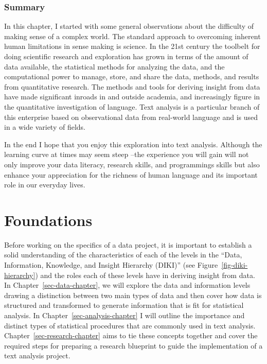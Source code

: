 \documentclass[
  letterpaper,
]{book}
\theoremstyle{definition}
\theoremstyle{remark}
\begin{document}
\section*{Summary}\label{summary}


In this chapter, I started with some general observations about the
difficulty of making sense of a complex world. The standard approach to
overcoming inherent human limitations in sense making is science. In the
21st century the toolbelt for doing scientific research and exploration
has grown in terms of the amount of data available, the statistical
methods for analyzing the data, and the computational power to manage,
store, and share the data, methods, and results from quantitative
research. The methods and tools for deriving insight from data have made
significant inroads in and outside academia, and increasingly figure in
the quantitative investigation of language. Text analysis is a
particular branch of this enterprise based on observational data from
real-world language and is used in a wide variety of fields.

In the end I hope that you enjoy this exploration into text analysis.
Although the learning curve at times may seem steep --the experience you
will gain will not only improve your data literacy, research skills, and
programmings skills but also enhance your appreciation for the richness
of human language and its important role in our everyday lives.

\part{Foundations}

Before working on the specifics of a data project, it is important to
establish a solid understanding of the characteristics of each of the
levels in the ``Data, Information, Knowledge, and Insight Hierarchy
(DIKI)'' (see Figure~\ref{fig-diki-hierarchy}) and the roles each of
these levels have in deriving insight from data. In
Chapter~\ref{sec-data-chapter}, we will explore the data and information
levels drawing a distinction between two main types of data and then
cover how data is structured and transformed to generate information
that is fit for statistical analysis. In
Chapter~\ref{sec-analysis-chapter} I will outline the importance and
distinct types of statistical procedures that are commonly used in text
analysis. Chapter~\ref{sec-research-chapter} aims to tie these concepts
together and cover the required steps for preparing a research blueprint
to guide the implementation of a text analysis project.
\end{document}
